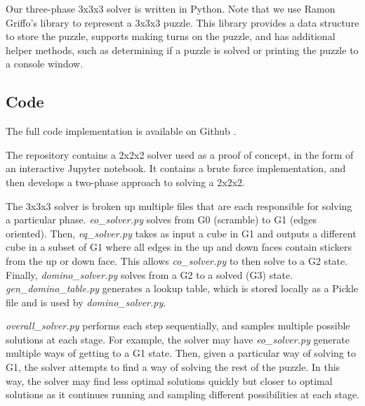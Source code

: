 \documentclass{article}
\begin{document}
Our three-phase 3x3x3 solver is written in Python. Note that we use Ramon Griffo's library \cite{git-lib} to represent a 3x3x3 puzzle. This library provides a data structure to store the puzzle, supports making turns on the puzzle, and has additional helper methods, such as determining if a puzzle is solved or printing the puzzle to a console window.

\subsection{Code}

The full code implementation is available on Github \cite{git-solver}.

The repository contains a 2x2x2 solver used as a proof of concept, in the form of an interactive Jupyter notebook. It contains a brute force implementation, and then develops a two-phase approach to solving a 2x2x2.

The 3x3x3 solver is broken up multiple files that are each responsible for solving a particular phase. \emph{eo\_solver.py} solves from G0 (scramble) to G1 (edges oriented). Then, \emph{eq\_solver.py} takes as input a cube in G1 and outputs a different cube in a subset of G1 where all edges in the up and down faces contain stickers from the up or down face. This allows \emph{co\_solver.py} to then solve to a G2 state. Finally, \emph{domino\_solver.py} solves from a G2 to a solved (G3) state. \emph{gen\_domino\_table.py} generates a lookup table, which is stored locally as a Pickle file and is used by \emph{domino\_solver.py}. 

\emph{overall\_solver.py} performs each step sequentially, and samples multiple possible solutions at each stage. For example, the solver may have \emph{eo\_solver.py} generate multiple ways of getting to a G1 state. Then, given a particular way of solving to G1, the solver attempts to find a way of solving the rest of the puzzle. In this way, the solver may find less optimal solutions quickly but closer to optimal solutions as it continues running and sampling different possibilities at each stage.
\end{document}
